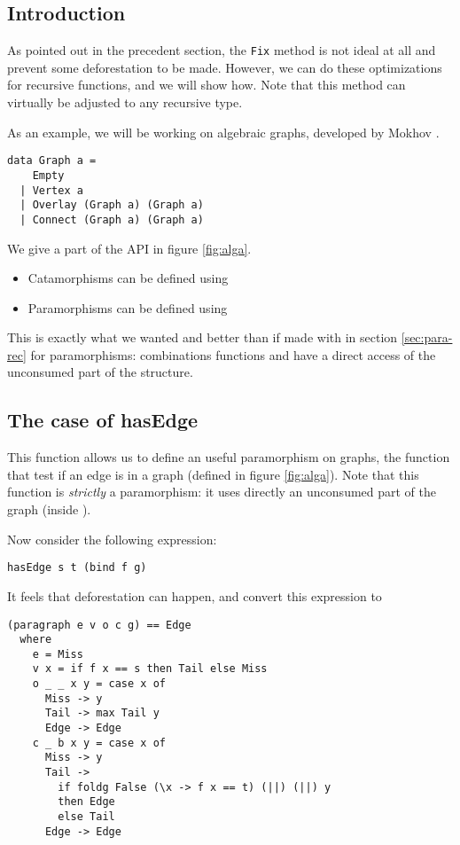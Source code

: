 
\subsection{Introduction}
As pointed out in the precedent section, the \verb|Fix| method is not ideal at all and prevent some deforestation to be made.
However, we can do these optimizations for recursive functions, and we will show how. Note that this method can virtually be adjusted to any recursive type.

As an example, we will be working on algebraic graphs, developed by Mokhov \cite{Mokhov:2017:AGC:3156695.3122956}.
\begin{verbatim}
data Graph a =
    Empty
  | Vertex a
  | Overlay (Graph a) (Graph a)
  | Connect (Graph a) (Graph a)
\end{verbatim}

We give a part of the API in figure \ref{fig:alga}.
\begin{itemize}
	\item Catamorphisms can be defined using 
	\item Paramorphisms can be defined using 
\end{itemize}

This is exactly what we wanted and better than if made with  in section \ref{sec:para-rec} for paramorphisms: combinations functions  and  have a direct access of the unconsumed part of the structure.




\subsection{The case of hasEdge}
This function allows us to define an useful paramorphism on graphs, the  function that test if an edge is in a graph (defined in figure \ref{fig:alga}). Note that this function is \emph{strictly} a paramorphism: it uses directly an unconsumed part of the graph (inside ).

Now consider the following expression:
\begin{verbatim}
hasEdge s t (bind f g)
\end{verbatim}

It feels that deforestation can happen, and convert this expression to
\begin{verbatim}
(paragraph e v o c g) == Edge
  where
    e = Miss
    v x = if f x == s then Tail else Miss
    o _ _ x y = case x of
      Miss -> y
      Tail -> max Tail y
      Edge -> Edge
    c _ b x y = case x of
      Miss -> y
      Tail ->
        if foldg False (\x -> f x == t) (||) (||) y
        then Edge
        else Tail
      Edge -> Edge
\end{verbatim}

